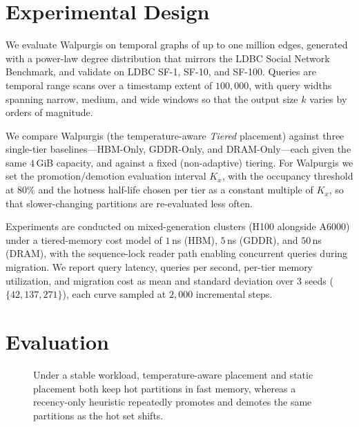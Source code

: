 \documentclass{article}
\begin{document}
\section{Experimental Design}
\label{sec:experimental_design}

We evaluate Walpurgis on temporal graphs of up to one million edges, generated with a
power-law degree distribution that mirrors the LDBC Social Network Benchmark, and
validate on LDBC SF-1, SF-10, and SF-100. Queries are temporal range scans over a
timestamp extent of $100{,}000$, with query widths spanning narrow, medium, and wide
windows so that the output size $k$ varies by orders of magnitude.

We compare Walpurgis (the temperature-aware \emph{Tiered} placement) against three
single-tier baselines---HBM-Only, GDDR-Only, and DRAM-Only---each given the same
$4$\,GiB capacity, and against a fixed (non-adaptive) tiering. For Walpurgis we set the
promotion/demotion evaluation interval $K_x$, with the occupancy threshold at $80\%$ and
the hotness half-life chosen per tier as a constant multiple of $K_x$, so that
slower-changing partitions are re-evaluated less often.

Experiments are conducted on mixed-generation clusters (H100 alongside A6000) under a
tiered-memory cost model of $1$\,ns (HBM), $5$\,ns (GDDR), and $50$\,ns (DRAM), with the
sequence-lock reader path enabling concurrent queries during migration. We report query
latency, queries per second, per-tier memory utilization, and migration cost as mean and
standard deviation over $3$ seeds ($\{42, 137, 271\}$), each curve sampled at $2{,}000$
incremental steps.

\section{Evaluation}
\label{sec:eval}

\begin{figure}[t]
\centering
{}
\caption{Under a stable workload, temperature-aware placement and static placement both
keep hot partitions in fast memory, whereas a recency-only heuristic repeatedly promotes
and demotes the same partitions as the hot set shifts.}
\label{fig:toy}
\end{figure}
\end{document}
